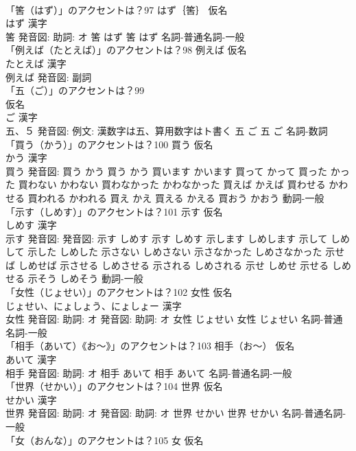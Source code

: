 \documentclass[8pt]{extreport}
\begin{document}
\begin{CJK}{UTF8}{min}
\\	「筈（はず）」のアクセントは？97	はず｛筈｝ 仮名　
\\	はず 漢字　
\\	筈 発音図: 助詞: オ	筈 はず		筈 はず				名詞-普通名詞-一般 
\\	「例えば（たとえば）」のアクセントは？98	例えば 仮名　
\\	たとえば 漢字　
\\	例えば 発音図:							副詞 
\\	「五（ご）」のアクセントは？99	
\\	仮名　
\\	ご 漢字　
\\	五、５ 発音図: 例文: 漢数字は五、算用数字はト書く	五 ご		五 ご				名詞-数詞 
\\	「買う（かう）」のアクセントは？100	買う 仮名　
\\	かう 漢字　
\\	買う 発音図:	買う かう		買う かう 買います かいます 買って かって 買った かった 買わない かわない 買わなかった かわなかった 買えば かえば 買わせる かわせる 買われる かわれる 買え かえ 買える かえる 買おう かおう				動詞-一般 
\\	「示す（しめす）」のアクセントは？101	示す 仮名　
\\	しめす 漢字　
\\	示す 発音図: 発音図:	示す しめす		示す しめす 示します しめします 示して しめして 示した しめした 示さない しめさない 示さなかった しめさなかった 示せば しめせば 示させる しめさせる 示される しめされる 示せ しめせ 示せる しめせる 示そう しめそう				動詞-一般 
\\	「女性（じょせい）」のアクセントは？102	女性 仮名　
\\	じょせい、にょしょう、にょしょー 漢字　
\\	女性 発音図: 助詞: オ 発音図: 助詞: オ	女性 じょせい		女性 じょせい				名詞-普通名詞-一般 
\\	「相手（あいて）《お〜》」のアクセントは？103	相手（お〜） 仮名　
\\	あいて 漢字　
\\	相手 発音図: 助詞: オ	相手 あいて		相手 あいて				名詞-普通名詞-一般 
\\	「世界（せかい）」のアクセントは？104	世界 仮名　
\\	せかい 漢字　
\\	世界 発音図: 助詞: オ 発音図: 助詞: オ	世界 せかい		世界 せかい				名詞-普通名詞-一般 
\\	「女（おんな）」のアクセントは？105	女 仮名　

\end{CJK}
\end{document}
